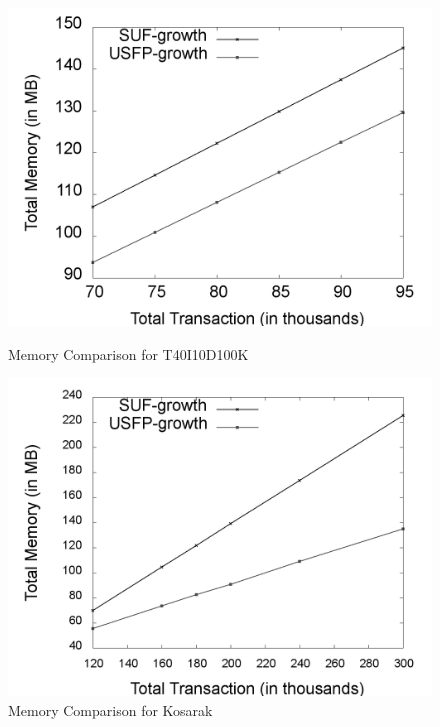 \documentclass[conference]{IEEEtran}
\begin{document}
\begin{figure}[t]
	\begin{minipage}{0.49\linewidth}
		\centering
		\includegraphics[width=\textwidth]{images/result/g_t10_memory_node}
		\caption{Memory Comparison for T40I10D100K}
		\label{result:g_t10_memory_node}
	\end{minipage}%
	\begin{minipage}{0.49\linewidth}
	   \centering
	   \includegraphics[width=\textwidth]{images/result/g_k_memory_node}
	   \caption{Memory Comparison for Kosarak}
	   \label{result:g_k_memory_node}
    \end{minipage}
\end{figure}
\end{document}
